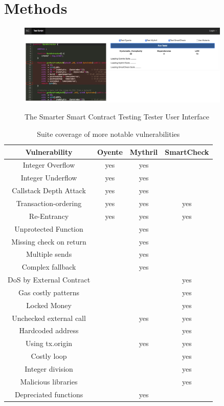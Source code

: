 \section{Methods}

\begin{figure}
\begin{center}
  \includegraphics[width=0.9\textwidth]{img/ui1.jpg}
  \label{fig:ui1}
  \caption{The Smarter Smart Contract Testing Tester User Interface}
\end{center}
\end{figure}

\begin{table}[h!]
\begin{tabular}{|cccc|}
\hline
\textbf{Vulnerability}	&\textbf{Oyente}&	\textbf{Mythril} & \textbf{SmartCheck}	\\
\hline
Integer Overflow & yes & yes &  \\
Integer Underflow & yes & yes &  \\
Callstack Depth Attack & yes & yes & \\
Transaction-ordering & yes & yes & yes\\
Re-Entrancy & yes & yes & yes \\
Unprotected Function & & yes & \\
Missing check on return & & yes & \\
Multiple sends & & yes & \\
Complex fallback& & yes & \\
DoS by External Contract & & & yes \\
Gas costly patterns & & & yes \\
Locked Money & & & yes \\
Unchecked external call & & yes & yes \\
Hardcoded address & & & yes \\
Using tx.origin & & yes & yes\\
Costly loop & & & yes \\
Integer division & & & yes \\
Malicious libraries & & & yes \\
Depreciated functions & & yes & \\
\hline
\end{tabular}\\
\label{coverage}
\caption{ Suite coverage of more notable vulnerabilities}
\end{table} 
